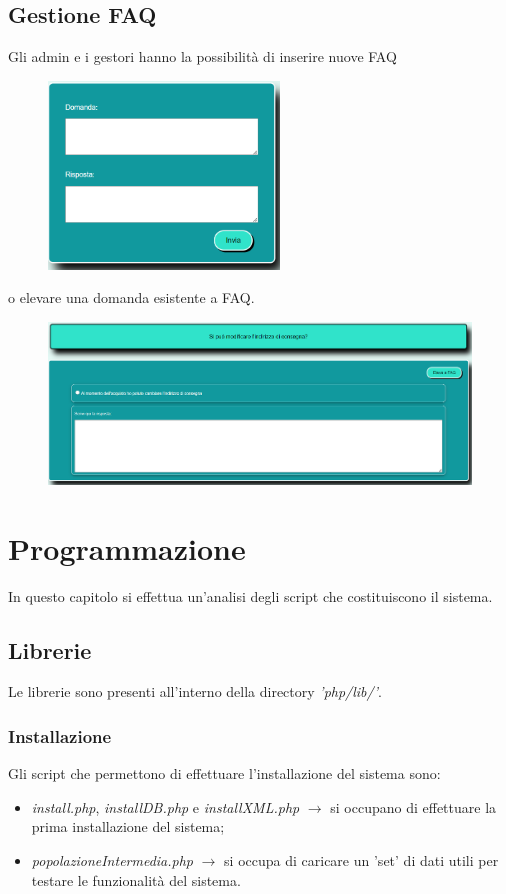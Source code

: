 \documentclass[a4paper, 14pt]{article}
\begin{document}
\begin{flushleft}
			\subsection{Gestione FAQ}
				Gli admin e i gestori hanno la possibilità di inserire nuove FAQ
				\begin{figure}[H]
					\centering
					\includegraphics[height=5cm, frame=2pt]{"screenInserimentoFaq.png"}	
				\end{figure}
				o elevare una domanda esistente a FAQ.
				\begin{figure}[H]
					\centering
					\includegraphics[width=\textwidth, frame=2pt]{"screenElevaFaq.png"}	
				\end{figure}
		\newpage
	\section{Programmazione}
		In questo capitolo si effettua un'analisi degli script che costituiscono il sistema.
		\subsection{Librerie}
			Le librerie sono presenti all'interno della directory \textit{'php/lib/'}. \\
			\subsubsection{Installazione}
			Gli script che permettono di effettuare l'installazione del sistema sono:
				\begin{itemize}
					\item \textit{install.php}, \textit{installDB.php} e \textit{installXML.php} $\rightarrow$ si occupano di effettuare la prima 
									installazione del sistema;
					\item \textit{popolazioneIntermedia.php} $\rightarrow$ si occupa di caricare un 'set' di dati utili per testare le funzionalità del
									sistema.
				\end{itemize}
			

\end{flushleft}
\end{document}
